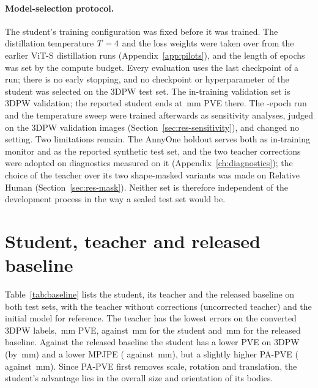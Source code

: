 \paragraph{Model-selection protocol.}\label{sec:res-selection}
The student's training configuration was fixed before it was trained. The distillation temperature
$T = 4$ and the loss weights were taken over from the earlier ViT-S distillation runs
(Appendix~\ref{app:pilots}), and the length of \MethodStudentEpochs{} epochs was set by the compute budget. Every
evaluation uses the last checkpoint of a run; there is no early stopping, and no checkpoint or hyperparameter of the
student was selected on the 3DPW test set. The in-training validation set is 3DPW validation; the reported student
ends at \SelThirtyValPVE\,mm PVE there. The \StudentSixtyEpochs-epoch run and the temperature sweep were trained
afterwards as sensitivity analyses, judged on the 3DPW validation images (Section~\ref{sec:res-sensitivity}), and
changed no setting. Two limitations
remain. The AnnyOne holdout serves both as in-training monitor and as the reported synthetic test set, and the two
teacher corrections were adopted on diagnostics measured on it (Appendix~\ref{ch:diagnostics}); the choice of the
teacher over its two shape-masked variants was made on Relative Human (Section~\ref{sec:res-mask}). Neither set is
therefore independent of the development process in the way a sealed test set would be.


\section{Student, teacher and released baseline}
\label{sec:res-baseline}



Table~\ref{tab:baseline} lists the student, its teacher and the released baseline on both test sets, with the
teacher without corrections (uncorrected teacher) and the initial model for reference. The teacher has the lowest
errors on the converted 3DPW labels, \FinalThreeDPW\,mm PVE, against \StudentThreeDPW\,mm for the student and
\NAVERThreeDPW\,mm for the released baseline. Against the released baseline the student has a lower PVE on 3DPW (by
\StudentGainOverNAVERThreeDPW\,mm) and a lower MPJPE (\StudentMPJPEThreeDPW{} against \NAVERMPJPEThreeDPW\,mm), but a
slightly higher PA-PVE (\StudentPAThreeDPW{} against \NAVERPAThreeDPW\,mm). Since PA-PVE first removes scale, rotation and
translation, the student's advantage lies in the overall size and orientation of its bodies.


